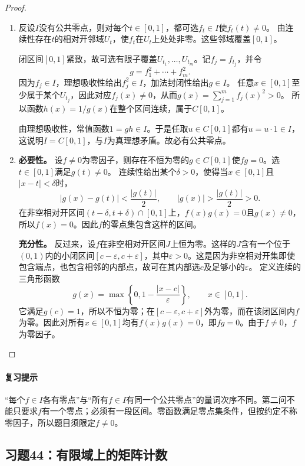 \documentclass[UTF8,a4paper,11pt,fontset=windows]{ctexart}
\begin{document}
\begin{proof}
\begin{enumerate}\item
反设$I$没有公共零点，则对每个$t\in[0,1]$，都可选$f_t\in I$使$f_t(t)\ne0$。
由连续性存在$t$的相对开邻域$U_t$，使$f_t$在$U_t$上处处非零。这些邻域覆盖$[0,1]$。

闭区间$[0,1]$紧致，故可选有限子覆盖$U_{t_1},\ldots,U_{t_m}$。记$f_j=f_{t_j}$，并令
\[
g=f_1^2+\cdots+f_m^2.
\]
因为$f_j\in I$，理想吸收性给出$f_j^2\in I$，加法封闭性给出$g\in I$。
任意$x\in[0,1]$至少属于某个$U_{t_j}$，因此对应$f_j(x)\ne0$，从而$g(x)=\sum_{j=1}^m f_j(x)^2>0$。
所以函数$h(x)=1/g(x)$在整个区间连续，属于$C[0,1]$。

由理想吸收性，常值函数$1=gh\in I$。于是任取$u\in C[0,1]$都有$u=u\cdot1\in I$，这说明$I=C[0,1]$，与$I$为真理想矛盾。故必有公共零点。

\item\textbf{必要性。}
设$f\ne0$为零因子，则存在不恒为零的$g\in C[0,1]$使$fg=0$。选$t\in[0,1]$满足$g(t)\ne0$。
连续性给出某个$\delta>0$，使得当$x\in[0,1]$且$|x-t|<\delta$时，
\[
|g(x)-g(t)|<\frac{|g(t)|}{2},\qquad
|g(x)|>\frac{|g(t)|}{2}>0.
\]
在非空相对开区间$(t-\delta,t+\delta)\cap[0,1]$上，$f(x)g(x)=0$且$g(x)\ne0$，所以$f(x)=0$。因此$f$的零点集包含这样的区间。

\textbf{充分性。}
反过来，设$f$在非空相对开区间$J$上恒为零。这样的$J$含有一个位于$(0,1)$内的小闭区间$[c-\varepsilon,c+\varepsilon]$，其中$\varepsilon>0$。这是因为非空相对开集即使包含端点，也包含相邻的内部点，故可在其内部选$c$及足够小的$\varepsilon$。
定义连续的三角形函数
\[
g(x)=\max\left\{0,1-\frac{|x-c|}{\varepsilon}\right\},\qquad x\in[0,1].
\]
它满足$g(c)=1$，所以不恒为零；在$[c-\varepsilon,c+\varepsilon]$外为零，而在该闭区间内$f$为零。因此对所有$x\in[0,1]$均有$f(x)g(x)=0$，即$fg=0$。由于$f\ne0$，$f$为零因子。
\end{enumerate}
\end{proof}

\paragraph{复习提示}
“每个$f\in I$各有零点”与“所有$f\in I$有同一个公共零点”的量词次序不同。第二问不能只要求$f$有一个零点；必须有一段区间。零函数满足零点集条件，但按约定不称零因子，所以题目须限定$f\ne0$。


\subsection{习题44：\texorpdfstring{有限域上的矩阵计数}{有限域上的矩阵计数}}
\label{ex:1:44}
\end{document}
